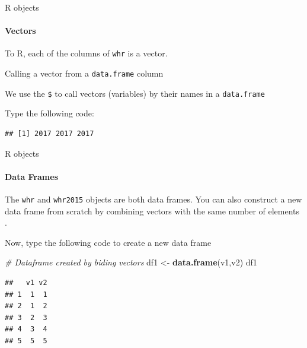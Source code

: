\documentclass[ignorenonframetext,]{beamer}
\newenvironment{Shaded}{\begin{snugshade}}{\end{snugshade}}
\newcommand{\KeywordTok}[1]{\textcolor[rgb]{0.13,0.29,0.53}{\textbf{#1}}}
\newcommand{\DecValTok}[1]{\textcolor[rgb]{0.00,0.00,0.81}{#1}}
\newcommand{\StringTok}[1]{\textcolor[rgb]{0.31,0.60,0.02}{#1}}
\newcommand{\CommentTok}[1]{\textcolor[rgb]{0.56,0.35,0.01}{\textit{#1}}}
\newcommand{\OperatorTok}[1]{\textcolor[rgb]{0.81,0.36,0.00}{\textbf{#1}}}
\newcommand{\NormalTok}[1]{#1}
\begin{document}
\begin{frame}[fragile]{R objects}

\framesubtitle{Vectors}

To R, each of the columns of \texttt{whr} is a vector.

\begin{block}{Calling a vector from a \texttt{data.frame} column}

We use the \texttt{\$} to call vectors (variables) by their names in a
\texttt{data.frame}

\end{block}

\begin{block}{Type the following code:}

\begin{Shaded}
\end{Shaded}

\begin{verbatim}
## [1] 2017 2017 2017
\end{verbatim}

\end{block}

\end{frame}

\begin{frame}[fragile]{R objects}

\framesubtitle{Data Frames}

The \texttt{whr} and \texttt{whr2015} objects are both data frames. You
can also construct a new data frame from scratch by combining vectors
with the same number of elements .

\begin{block}{Now, type the following code to create a new data frame}

\begin{Shaded}
\begin{Highlighting}[]
\CommentTok{# Dataframe created by biding vectors}
\NormalTok{df1 <-}\StringTok{ }\KeywordTok{data.frame}\NormalTok{(v1,v2)}
\NormalTok{df1}
\end{Highlighting}
\end{Shaded}

\begin{verbatim}
##   v1 v2
## 1  1  1
## 2  1  2
## 3  2  3
## 4  3  4
## 5  5  5
\end{verbatim}

\end{block}

\end{frame}
\end{document}
